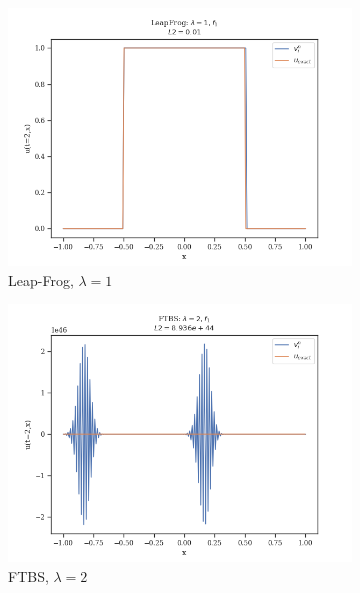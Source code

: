 \begin{figure}
\begin{subfigure}{0.3\linewidth}
        \includegraphics[width=\linewidth]{figures/LeapFrog/LeapFrog_lambda=1,f1}
        \caption{Leap-Frog, $\lambda =1$}
    \end{subfigure}
    \hfill
    \vspace{1cm}
    \begin{subfigure}{0.3\linewidth}
        \centering
        \includegraphics[width=\linewidth]{figures/FTBS/FTBS_lambda=2,f1}
        \caption{FTBS, $\lambda = 2$}
    \end{subfigure}
    \hfill
    \begin{subfigure}{0.3\linewidth}
        \centering

\end{subfigure}
\end{figure}
